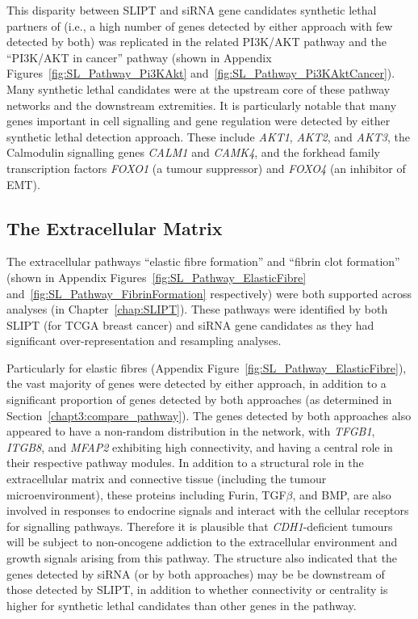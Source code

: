 This disparity between \gls{SLIPT} and \gls{siRNA} gene candidates \gls{synthetic lethal} partners of  (i.e., a high number of genes detected by either approach with few detected by both) was replicated in the related PI3K/AKT \gls{pathway} and the ``PI3K/AKT in cancer'' \gls{pathway} (shown in Appendix Figures~\ref{fig:SL_Pathway_Pi3KAkt} and~\ref{fig:SL_Pathway_Pi3KAktCancer}). Many \gls{synthetic lethal} candidates were at the upstream core of these \gls{pathway} networks and the downstream extremities. It is particularly notable that many genes important in cell signalling and gene regulation were detected by either \gls{synthetic lethal} detection approach. These include \textit{AKT1}, \textit{AKT2}, and \textit{AKT3}, the Calmodulin signalling genes \textit{CALM1} and \textit{CAMK4}, and the forkhead family transcription factors \textit{FOXO1} (a \gls{tumour suppressor}) and \textit{FOXO4} (an inhibitor of \acrshort{EMT}).

\FloatBarrier


\subsection{The Extracellular Matrix}  \label{chapt4:SL_Genes_ECM}

The extracellular \glspl{pathway} ``elastic fibre formation'' and ``fibrin clot formation'' (shown in Appendix Figures~\ref{fig:SL_Pathway_ElasticFibre} and~\ref{fig:SL_Pathway_FibrinFormation} respectively) were both supported across analyses (in Chapter~\ref{chap:SLIPT}). These \glspl{pathway} were identified by both \gls{SLIPT} (for \gls{TCGA} breast cancer) and \gls{siRNA} gene candidates as they had significant over-representation and resampling analyses.


Particularly for elastic fibres (Appendix Figure~\ref{fig:SL_Pathway_ElasticFibre}), the vast majority of genes were detected by either approach, in addition to a significant proportion of genes detected by both approaches (as determined in Section~\ref{chapt3:compare_pathway}). The genes detected by both approaches also appeared to have a non-random distribution in the network, with \textit{TFGB1}, \textit{ITGB8}, and \textit{MFAP2} exhibiting high connectivity, and having a central role in their respective \gls{pathway} modules. In addition to a structural role in the extracellular matrix and connective tissue (including the tumour microenvironment), these proteins including Furin, TGF$\beta$, and BMP, are also involved in responses to endocrine signals and interact with the cellular receptors for signalling \glspl{pathway}. Therefore it is plausible that \textit{CDH1}-deficient tumours will be subject to \gls{non-oncogene addiction} to the extracellular environment and growth signals arising from this \gls{pathway}. The  structure also indicated that the genes detected by \gls{siRNA} (or by both approaches) may be be downstream of those detected by \gls{SLIPT}, in addition to whether connectivity or \gls{centrality} is higher for \gls{synthetic lethal} candidates than other genes in the \gls{pathway}.

